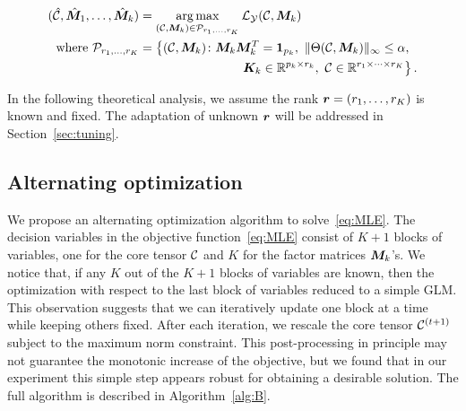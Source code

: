 \documentclass[12pt]{article}
\theoremstyle{plain}
\theoremstyle{definition}
\begin{document}
\begin{align} \label{eq:MLE} 
(\hat {\mathcal{C}}, \hat {\bm M}_1,\ldots,\hat {\bm M}_k) &=\operatorname*{arg\,max}_{(\mathcal{C},\bm M_k)\in \mathcal{P}_{r_1,\ldots,r_K}} \mathcal{L}_{\mathcal{Y}}(\mathcal{C},\bm M_k)\\
\text{where } \mathcal{P}_{r_1,\ldots,r_K}&=\left\{(\mathcal{C},\bm M_k)\colon \bm M_k\bm M^T_k=\mathbf{1}_{p_k},\ \lVert\Theta(\mathcal{C},\bm M_k)\rVert_\infty\leq \alpha, \right.\\
&\quad \quad\quad \quad  \quad \quad\quad \quad \left.\bm K_k\in\mathbb{R}^{p_k\times r_k},\ \mathcal{C}\in\mathbb{R}^{r_1\times \cdots\times r_K}\right\}.
\end{align}

In the following theoretical analysis, we assume the rank $\bm{r}=(r_1,\ldots,r_K)$ is known and fixed. The adaptation of unknown $\bm{r}$ will be addressed in Section~\ref{sec:tuning}. 

\subsection{Alternating optimization} \label{subsec:alg}
We propose an alternating optimization algorithm to solve~\eqref{eq:MLE}. 
The decision variables in the objective function~\eqref{eq:MLE} consist of $K+1$ blocks of variables, one for the core tensor $\mathcal{C}$ and $K$ for the factor matrices $\bm M_k$'s. We notice that, if any $K$ out of the $K+1$ blocks of variables are known, then the optimization with respect to the last block of variables reduced to a simple GLM. This observation suggests that we can iteratively update one block at a time while keeping others fixed. After each iteration, we rescale the core tensor $\mathcal{C}^{(t+1)}$ subject to the maximum norm constraint. This post-processing in principle may not guarantee the monotonic increase of the objective, but we found that in our experiment this simple step appears robust for obtaining a desirable solution. The full algorithm is described in Algorithm~\ref{alg:B}.
\end{document}
